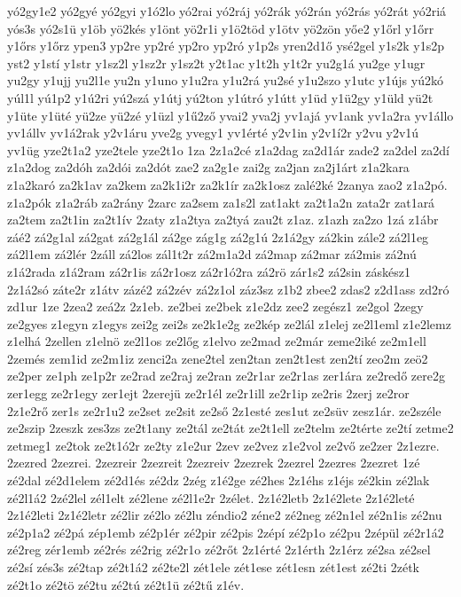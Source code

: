 {yó2gy1e2
yó2gyé
yó2gyi
y1ó2lo
yó2rai
yó2ráj
yó2rák
yó2rán
yó2rás
yó2rát
yó2riá
yós3s
yó2s1ü
y1öb
yö2kés
y1önt
yö2r1i
y1ö2töd
y1ötv
yö2zön
yőe2
y1őrl
y1őrr
y1őrs
y1őrz
ypen3
yp2re
yp2ré
yp2ro
yp2ró
y1p2s
yren2d1ő
ysé2gel
y1s2k
y1s2p
yst2
y1stí
y1str
y1sz2l
y1sz2r
y1sz2t
y2t1ac
y1t2h
y1t2r
yu2g1á
yu2ge
y1ugr
yu2gy
y1ujj
yu2l1e
yu2n
y1uno
y1u2ra
y1u2rá
yu2sé
y1u2szo
y1utc
y1újs
yú2kó
yúl1l
yú1p2
y1ú2ri
yú2szá
y1útj
yú2ton
y1útró
y1útt
y1üd
y1ü2gy
y1üld
yü2t
y1üte
y1üté
yü2ze
yü2zé
y1üzl
y1ű2ző
yvai2
yva2j
yv1ajá
yv1ank
yv1a2ra
yv1állo
yv1állv
yv1á2rak
y2v1áru
yve2g
yvegy1
yv1érté
y2v1in
y2v1í2r
y2vu
y2v1ú
yv1üg
yze2t1a2
yze2tele
yze2t1o
1za
2z1a2cé
z1a2dag
za2d1ár
zade2
za2del
za2dí
z1a2dog
za2dóh
za2dói
za2dót
zae2
za2g1e
zai2g
za2jan
za2j1árt
z1a2kara
z1a2karó
za2k1av
za2kem
za2k1i2r
za2k1ír
za2k1osz
zalé2ké
2zanya
zao2
z1a2pó.
z1a2pók
z1a2ráb
za2rány
2zarc
za2sem
za1s2l
zat1akt
za2t1a2n
zata2r
zat1ará
za2tem
za2t1in
za2t1ív
2zaty
z1a2tya
za2tyá
zau2t
z1az.
z1azh
za2zo
1zá
z1ábr
záé2
zá2g1al
zá2gat
zá2g1ál
zá2ge
zág1g
zá2g1ú
2z1á2gy
zá2kin
zále2
zá2l1eg
zá2l1em
zá2lér
2záll
zá2los
zál1t2r
zá2m1a2d
zá2map
zá2mar
zá2mis
zá2nú
z1á2rada
z1á2ram
zá2r1is
zá2r1osz
zá2r1ó2ra
zá2rö
zár1s2
zá2sin
záskész1
2z1á2só
záte2r
z1átv
zázé2
zá2zév
zá2z1ol
záz3sz
z1b2
zbee2
zdas2
z2d1ass
zd2ró
zd1ur
1ze
2zea2
zeá2z
2z1eb.
ze2bei
ze2bek
z1e2dz
zee2
zegész1
ze2gol
2zegy
ze2gyes
z1egyn
z1egys
zei2g
zei2s
ze2k1e2g
ze2kép
ze2lál
z1elej
ze2l1eml
z1e2lemz
z1elhá
2zellen
z1elnö
ze2l1os
ze2lőg
z1elvo
ze2mad
ze2már
zeme2iké
ze2m1ell
2zemés
zem1id
ze2m1iz
zenci2a
zene2tel
zen2tan
zen2t1est
zen2tí
zeo2m
zeö2
ze2per
ze1ph
ze1p2r
ze2rad
ze2raj
ze2ran
ze2r1ar
ze2r1as
zer1ára
ze2redő
zere2g
zer1egg
ze2r1egy
zer1ejt
2zerejü
ze2r1él
ze2r1ill
ze2r1ip
ze2ris
2zerj
ze2ror
2z1e2rő
zer1s
ze2r1u2
ze2set
ze2sit
ze2ső
2z1esté
zes1ut
ze2süv
zesz1ár.
ze2széle
ze2szip
2zeszk
zes3zs
ze2t1any
ze2tál
ze2tát
ze2t1ell
ze2telm
ze2térte
ze2tí
zetme2
zetmeg1
ze2tok
ze2t1ó2r
ze2ty
z1e2ur
2zev
ze2vez
z1e2vol
ze2vő
ze2zer
2z1ezre.
2zezred
2zezrei.
2zezreir
2zezreit
2zezreiv
2zezrek
2zezrel
2zezres
2zezret
1zé
zé2dal
zé2d1elem
zé2d1és
zé2dz
2zég
z1é2ge
zé2hes
2z1éhs
z1éjs
zé2kin
zé2lak
zé2l1á2
2zé2lel
zél1elt
zé2lene
zé2l1e2r
2zélet.
2z1é2letb
2z1é2lete
2z1é2leté
2z1é2leti
2z1é2letr
zé2lir
zé2lo
zé2lu
zéndio2
zéne2
zé2neg
zé2n1el
zé2n1is
zé2nu
zé2p1a2
zé2pá
zép1emb
zé2p1ér
zé2pir
zé2pis
2zépí
zé2p1o
zé2pu
2zépül
zé2r1á2
zé2reg
zér1emb
zé2rés
zé2rig
zé2r1o
zé2rőt
2z1érté
2z1érth
2z1érz
zé2sa
zé2sel
zé2sí
zés3s
zé2tap
zé2t1á2
zé2te2l
zét1ele
zét1ese
zét1esn
zét1est
zé2ti
2zétk
zé2t1o
zé2tö
zé2tu
zé2tú
zé2t1ü
zé2tű
z1év.
}
